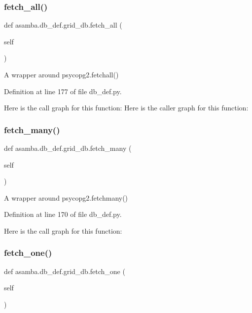 \subsubsection{\texorpdfstring{fetch\+\_\+all()}{fetch\_all()}}
{\footnotesize\ttfamily def asamba.\+db\+\_\+def.\+grid\+\_\+db.\+fetch\+\_\+all (\begin{DoxyParamCaption}\item[{}]{self }\end{DoxyParamCaption})}

\begin{DoxyVerb}A wrapper around psycopg2.fetchall()
\end{DoxyVerb}
 

Definition at line 177 of file db\+\_\+def.\+py.

Here is the call graph for this function\+:
Here is the caller graph for this function\+:
\mbox{\label{classasamba_1_1db__def_1_1grid__db_abd1922057f7741ee343b59cb9d948ffb}} 
\subsubsection{\texorpdfstring{fetch\+\_\+many()}{fetch\_many()}}
{\footnotesize\ttfamily def asamba.\+db\+\_\+def.\+grid\+\_\+db.\+fetch\+\_\+many (\begin{DoxyParamCaption}\item[{}]{self }\end{DoxyParamCaption})}

\begin{DoxyVerb}A wrapper around psycopg2.fetchmany()
\end{DoxyVerb}
 

Definition at line 170 of file db\+\_\+def.\+py.

Here is the call graph for this function\+:
\mbox{\label{classasamba_1_1db__def_1_1grid__db_a09c07f75a90b670fef71c6aacdca30a2}} 
\subsubsection{\texorpdfstring{fetch\+\_\+one()}{fetch\_one()}}
{\footnotesize\ttfamily def asamba.\+db\+\_\+def.\+grid\+\_\+db.\+fetch\+\_\+one (\begin{DoxyParamCaption}\item[{}]{self }\end{DoxyParamCaption})}

